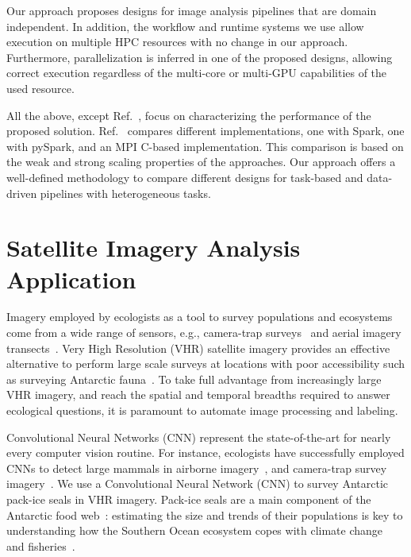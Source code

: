Our approach proposes designs for image analysis pipelines that are domain independent.
In addition, the workflow and runtime systems we use allow  execution on multiple HPC resources with no change in our approach. 
Furthermore, parallelization is inferred in one of the proposed designs,  allowing correct execution regardless of the multi-core or multi-GPU  capabilities of the used resource.
 
All the above, except Ref.~\cite{zhang2016kira}, focus on characterizing the performance of the proposed solution.
Ref.~\cite{zhang2016kira} compares different implementations, one with Spark, one with pySpark, and an MPI C-based implementation.
This comparison is based on the weak and strong scaling properties of the approaches.
Our approach offers a well-defined methodology to compare different designs for task-based and data-driven pipelines with heterogeneous tasks.
 

\section{Satellite Imagery Analysis Application}
\label{sec:ucase}
Imagery employed by ecologists as a tool to survey populations and ecosystems come from a wide range of sensors, e.g., camera-trap surveys~\cite{karanth1995estimating} and aerial imagery transects~\cite{western2009impact}.
Very High Resolution (VHR) satellite imagery provides an effective alternative to perform large scale surveys at locations with poor accessibility such as surveying Antarctic fauna~\cite{lynch2012detection}.
To take full advantage from increasingly large VHR imagery, and reach the spatial and temporal breadths required to answer ecological questions, it is paramount to automate image processing and labeling.

Convolutional Neural Networks (CNN) represent the state-of-the-art for nearly every computer vision routine.
For instance, ecologists have successfully employed CNNs to detect large mammals in airborne imagery~\cite{kellenberger2018detecting,polzounov2016right}, and camera-trap survey imagery~\cite{norouzzadeh2018automatically}.
We use a Convolutional Neural Network (CNN) to survey Antarctic pack-ice seals in VHR imagery.
Pack-ice seals are a main component of the Antarctic food web~\cite{fabra2008convention}: estimating the size and trends of their populations is key to understanding how the Southern Ocean ecosystem copes with climate change~\cite{hillebrand2018climate} and fisheries~\cite{reid2019climate}.

